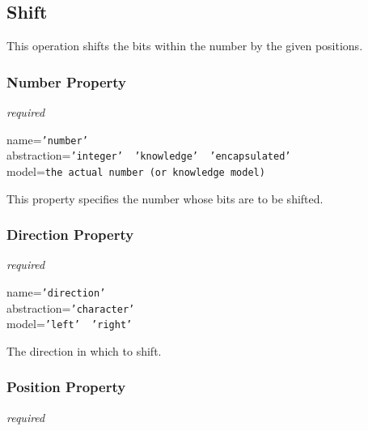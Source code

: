 %
%
%
%
%
%

\subsection{Shift}
\label{shift_heading}

This operation shifts the bits within the number by the given positions.

\subsubsection{Number Property}

\emph{required}

name=\texttt{'number'}\\
abstraction=\texttt{'integer' \vline\ 'knowledge' \vline\ 'encapsulated'}\\
model=\texttt{the actual number (or knowledge model)}

This property specifies the number whose bits are to be shifted.

\subsubsection{Direction Property}

\emph{required}

name=\texttt{'direction'}\\
abstraction=\texttt{'character'}\\
model=\texttt{'left' \vline\ 'right'}

The direction in which to shift.

\subsubsection{Position Property}

\emph{required}

